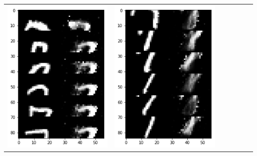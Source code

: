 \documentclass[12pt]{report} %
\begin{document}
\begin{tabular}{m{0.7cm}m{2.4cm}m{2.4cm}m{2.4cm}m{2.4cm}m{2.4cm}m{2.4cm}}
	\includegraphics[scale=0.3]{pictures/M1_7_up.png} & \includegraphics[scale=0.3]{pictures/M1_7_down.png} &

\end{tabular}
\end{document}
